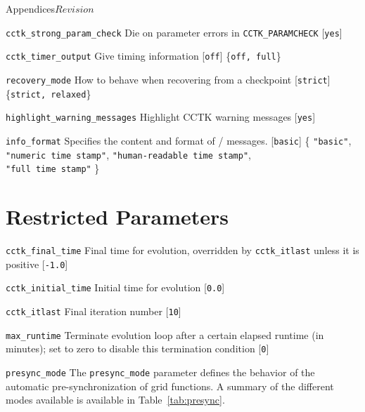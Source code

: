 \begin{cactuspart}{Appendices}{}{$Revision$}
\begin{Lentry}
\item[{\tt cctk\_strong\_param\_check}]
Die on parameter errors in {\tt CCTK\_PARAMCHECK} [{\tt yes}]

\item[{\tt cctk\_timer\_output}]
Give timing information [{\tt off}] \{{\tt off, full}\}

\item[{\tt recovery\_mode}]
How to behave when recovering from a checkpoint [{\tt strict}] \{{\tt strict, relaxed}\}

\item[{\tt highlight\_warning\_messages}]
Highlight CCTK warning messages [{\tt yes}]

\item[{\tt info\_format}]
Specifies the content and format of /
messages. [{\tt basic}]
\{%
\mbox{{\tt "basic"}},
\mbox{{\tt "numeric time stamp"}},
\mbox{{\tt "human-readable time stamp"}},\\
\mbox{{\tt "full time stamp"}}%
\}

\end{Lentry}

\section{Restricted Parameters}

\begin{Lentry}

\item [{\tt cctk\_final\_time}] Final time for evolution, overridden by
{\tt cctk\_itlast} unless it is positive [{\tt -1.0}]

\item[{\tt cctk\_initial\_time}]
Initial time for evolution [{\tt 0.0}]

\item [{\tt cctk\_itlast}]
Final iteration number [{\tt 10}]

\item [{\tt max\_runtime}]
Terminate evolution loop after a certain elapsed runtime (in minutes); set to zero to disable this termination condition [{\tt 0}]

\item [{\tt presync\_mode}]
The \texttt{presync\_mode} parameter defines the behavior of the automatic pre-synchronization of grid functions. A summary of the different modes available is available in Table~\ref{tab:presync}.


\end{Lentry}
\end{cactuspart}
